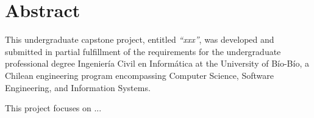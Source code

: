 \chapter*{Abstract}

This undergraduate capstone project, entitled \textit{“xxx”}, was developed and submitted in partial fulfillment of the requirements for the undergraduate professional degree Ingeniería Civil en Informática at the University of Bío-Bío, a Chilean engineering program encompassing Computer Science, Software Engineering, and Information Systems. 

This project focuses on ...